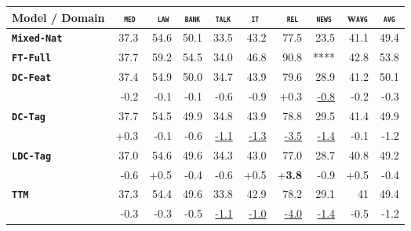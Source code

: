\documentclass[11pt,a4paper]{article}
\newcommand{\domain}[1]{\texttt{\textsc{#1}}}
\newcommand{\system}[1]{\texttt{\textbf{#1}}}
\newcommand{\SB}[1]{\textbf{#1}}
\newcommand{\SW}[1]{\underline{#1}}
\begin{document}
\begin{table*}
  \begin{tabular}{|p{2.5cm}|*{9}{r|}} \hline \footnotesize
    Model / Domain & \multicolumn{1}{c|}{\domain{ med}} & \multicolumn{1}{c|}{\domain{ law}} & \multicolumn{1}{c|}{\domain{bank}} & \multicolumn{1}{c|}{\domain{talk}} & \multicolumn{1}{c|}{\domain{ it }} & \multicolumn{1}{c|}{\domain{ rel}} & \multicolumn{1}{c|}{\domain{news}} & \multicolumn{1}{c|}{w\domain{avg}} & \multicolumn{1}{c|}{\domain{avg}} \\ \hline
    
    \system{Mixed-Nat}  & 37.3  & 54.6   & 50.1   & 33.5  & 43.2  & 77.5  & 23.5 & 41.1 & 49.4 \\
    \system{FT-Full}       & 37.7  & 59.2   & 54.5   & 34.0  & 46.8  & 90.8  & **** & 42.8 & 53.8 \\ \hline\hline
    
     \system{DC-Feat}     & 37.4 & 54.9   & 50.0    & 34.7  &  43.9  & 79.6 & 28.9  & 41.2 & 50.1\\[-2pt]
                   & -0.2 & -0.1  & -0.1 & -0.6 & -0.9 & +0.3 & \SW{-0.8} & -0.2 & -0.3\\

    \system{DC-Tag}      &  37.7 & 54.5   & 49.9    &  34.8 &  43.9  & 78.8 & 29.5  & 41.4 & 49.9\\[-2pt]
                   & +0.3  & -0.1   & -0.6    & \SW{-1.1}  &  \SW{-1.3}  &\SW{-3.5}  & \SW{-1.4}  & -0.1 & -1.2\\
    
    \system{LDC-Tag}    & 37.0   & 54.6  & 49.6    & 34.3  &  43.0  &77.0  & 28.7 & 40.8 & 49.2 \\[-2pt]
                    & -0.6 &	+0.5 &	-0.4 &	-0.6 &	+0.5 &	+\SB{3.8} &	-0.9 &	+0.5 &	-0.4 \\

    \system{TTM}           &  37.3 & 54.4   & 49.6    & 33.8  &  42.9  &78.2  & 29.1 & 41 & 49.4\\[-2pt]
                    & -0.3  & -0.3  & -0.5    & \SW{-1.1}  &  \SW{-1.0}  & \SW{-4.0}  & \SW{-1.4}& -0.5 & -1.2\\
    

\end{tabular}
\end{table*}
\end{document}
